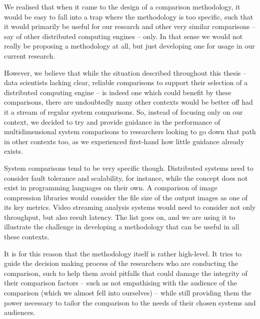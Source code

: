   We realised that when it came to the design of a comparison methodology, it would be easy to fall into a trap where the methodology is too specific, such that it would primarily be useful for our research and other very similar comparisons -- say of other distributed computing engines -- only. In that sense we would not really be proposing a methodology at all, but just developing one for usage in our current research.

  However, we believe that while the situation described throughout this thesis -- data scientists lacking clear, reliable comparisons to support their selection of a distributed computing engine -- is indeed one which could benefit by these comparisons, there are undoubtedly many other contexts would be better off had it a stream of regular system comparisons. So, instead of focusing only on our context, we decided to try and provide guidance in the performance of multidimensional system comparisons to researchers looking to go down that path in other contexts too, as we experienced first-hand how little guidance already exists.

  System comparisons tend to be very specific though. Distributed systems need to consider fault tolerance and scalability, for instance, while the concept does not exist in programming languages on their own. A comparison of image compression libraries would consider the file size of the output images as one of its key metrics. Video streaming analysis systems would need to consider not only throughput, but also result latency. The list goes on, and we are using it to illustrate the challenge in developing a methodology that can be useful in all these contexts.

  It is for this reason that the methodology itself is rather high-level. It tries to guide the decision making process of the researchers who are conducting the comparison, such to help them avoid pitfalls that could damage the integrity of their comparison factors -- such as not empathising with the audience of the comparison (which we almost fell into ourselves) -- while still providing them the power necessary to tailor the comparison to the needs of their chosen systems and audiences.

